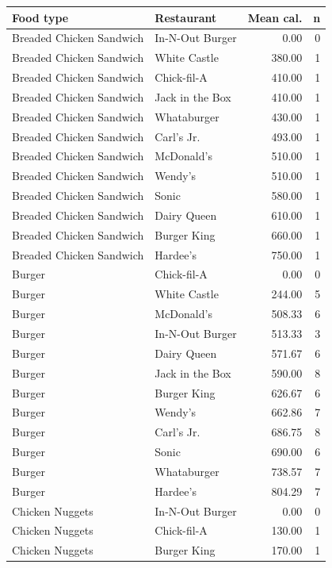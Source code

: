 \documentclass[11pt]{article}
\begin{document}
\begin{table}[H]\centering\footnotesize\setlength{\tabcolsep}{2pt}
\begin{minipage}{0.49\textwidth}\centering
\begin{tabular}{llrr}
\toprule
Food type & Restaurant & Mean cal. & n \\
\midrule
Breaded Chicken Sandwich & In-N-Out Burger & 0.00 & 0 \\
Breaded Chicken Sandwich & White Castle & 380.00 & 1 \\
Breaded Chicken Sandwich & Chick-fil-A & 410.00 & 1 \\
Breaded Chicken Sandwich & Jack in the Box & 410.00 & 1 \\
Breaded Chicken Sandwich & Whataburger & 430.00 & 1 \\
Breaded Chicken Sandwich & Carl's Jr. & 493.00 & 1 \\
Breaded Chicken Sandwich & McDonald's & 510.00 & 1 \\
Breaded Chicken Sandwich & Wendy's & 510.00 & 1 \\
Breaded Chicken Sandwich & Sonic & 580.00 & 1 \\
Breaded Chicken Sandwich & Dairy Queen & 610.00 & 1 \\
Breaded Chicken Sandwich & Burger King & 660.00 & 1 \\
Breaded Chicken Sandwich & Hardee's & 750.00 & 1 \\
Burger & Chick-fil-A & 0.00 & 0 \\
Burger & White Castle & 244.00 & 5 \\
Burger & McDonald's & 508.33 & 6 \\
Burger & In-N-Out Burger & 513.33 & 3 \\
Burger & Dairy Queen & 571.67 & 6 \\
Burger & Jack in the Box & 590.00 & 8 \\
Burger & Burger King & 626.67 & 6 \\
Burger & Wendy's & 662.86 & 7 \\
Burger & Carl's Jr. & 686.75 & 8 \\
Burger & Sonic & 690.00 & 6 \\
Burger & Whataburger & 738.57 & 7 \\
Burger & Hardee's & 804.29 & 7 \\
Chicken Nuggets & In-N-Out Burger & 0.00 & 0 \\
Chicken Nuggets & Chick-fil-A & 130.00 & 1 \\
Chicken Nuggets & Burger King & 170.00 & 1 \\

\end{tabular}
\end{minipage}
\end{table}
\end{document}
